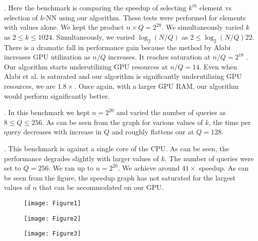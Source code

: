 \documentclass[10pt]{article}
\begin{document}
. Here the benchmark is comparing the speedup of selecting $k^{th}$ element vs selection of $k$-NN using our algorithm. These tests were performed for elements with values alone. We kept the product $n\times Q = 2^{28}$. We simultaneously varied $k$ as $2\le k \le 1024$. Simultaneously, we varied $\log_2(N/Q)$ as $2 \le \log_2(N/Q) 22$. There is a dramatic fall in performance gain because the method by Alabi increases GPU utilization as $n/Q$ increases. It reaches saturation at  $n/Q = 2^{18}$ \cite{Alabi:2012}. Our algorithm starts underutilizing GPU resources at $n/Q = 14$. Even when Alabi et al. is saturated and our algorithm is significantly underutilizing GPU resources, we are $1.8\times$.  Once again, with a larger GPU RAM, our algorithm would perform significantly better.

. In this benchmark we kept $n=2^{20}$ and varied the number of queries as $8 \le Q \le 256$.  As can be seen from the graph for various values of $k$, the time per query decreases with increase in $Q$ and roughly flattens our at $Q=128$.


.  This benchmark is against a single core of the CPU. As can be seen, the performance degrades slightly with larger values of $k$. The number of queries were set to $Q = 256$. We ran up to $n=2^{20}$. We achieve around $41 \times$ speedup. As can be seen from the figure, the speedup graph has not saturated for the largest values of $n$ that can be accommodated on our GPU. 

\newpage
\begin{figure}[!h]
\label{readin}
\begin{center}
\texttt{[image: Figure1]}
\end{center}
\caption{}
\end{figure}

\newpage
\begin{figure}[!h]
\label{pivot}
\begin{center}
\texttt{[image: Figure2]}
\end{center}
\caption{}
\end{figure}



\newpage
\begin{figure}[!h]
\label{writeout}
\begin{center}
\texttt{[image: Figure3]}
\end{center}
\caption{}
\end{figure}
\end{document}
